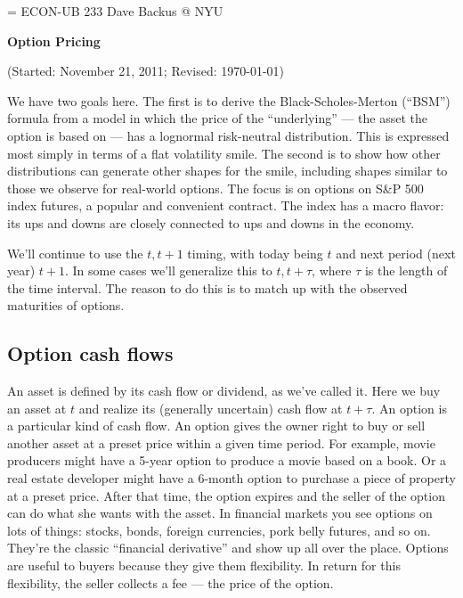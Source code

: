 \documentclass[11pt]{article}
\begin{document}
\parskip=\bigskipamount
\parindent=0.0in
\thispagestyle{empty}
{\large ECON-UB 233 \hfill Dave Backus @ NYU}

\bigskip\bigskip
\centerline{\Large \bf Option Pricing}
\centerline{(Started: November 21, 2011; Revised: \today)}

\bigskip
We have two goals here.
The first is to derive the Black-Scholes-Merton (``BSM'') formula from a model
in which the price of the ``underlying'' ---
the asset the option is based on ---
has a lognormal risk-neutral distribution.
This is expressed most simply in terms of a flat volatility smile.
The second is to show how other distributions can generate other
shapes for the smile, including shapes similar to those
we observe for real-world options.
The focus is on options on S\&P 500 index futures,
a popular and convenient contract.
The index has a macro flavor:  its ups and downs
are closely connected to ups and downs in the economy.


We'll continue to use the $t, t+1$ timing,
with today being $t$ and next period (next year) $t+1$.
In some cases we'll generalize this to $t,t+\tau$,
where $\tau$ is the length of the time interval.
The reason to do this is to match up with the observed maturities of options.


\subsection*{Option cash flows}

An asset is defined by its cash flow or dividend, as we've called it.
Here we buy an asset at $t$ and realize its (generally uncertain) cash flow at $t+\tau$.
An option is a particular kind of cash flow.
An option gives the owner right to buy or sell another asset at a preset price
within a given time period.
For example, movie producers might have a 5-year option to produce a
movie based on a book.
Or a real estate developer might have a 6-month option to purchase
a piece of property at a preset price.
After that time, the option expires and
the seller of the option can do what she wants with the asset.
In financial markets you see options on lots of things:  stocks, bonds,
foreign currencies, pork belly futures, and so on.
They're the classic ``financial derivative'' and show up all over the place.
Options are useful to buyers because they give them flexibility.
In return for this flexibility, the seller collects a fee --- the price
of the option.
\end{document}
